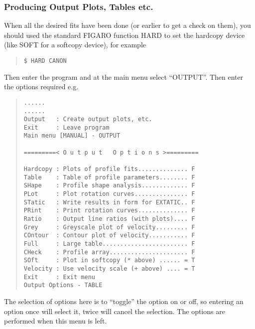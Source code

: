 \subsubsection{Producing Output Plots, Tables etc.}
\label{long.out}

When all the desired fits have been done (or
earlier to get a check on them), you should used the standard FIGARO
function HARD to set the hardcopy device (like SOFT for a softcopy
device), for example
\begin{quote}\begin{verbatim}
$ HARD CANON
\end{verbatim}\end{quote}

Then enter the program and at the main menu select ``OUTPUT''. Then
enter the options required e.g.\
\begin{quote}\begin{verbatim}
......
......
Output   : Create output plots, etc.
Exit     : Leave program
Main menu [MANUAL] - OUTPUT

=========< O u t p u t   O p t i o n s >=========

Hardcopy : Plots of profile fits.............. F
Table    : Table of profile parameters........ F
SHape    : Profile shape analysis............. F
PLot     : Plot rotation curves............... F
STatic   : Write results in form for EXTATIC.. F
PRint    : Print rotation curves.............. F
Ratio    : Output line ratios (with plots).... F
Grey     : Greyscale plot of velocity......... F
COntour  : Contour plot of velocity........... F
Full     : Large table........................ F
CHeck    : Profile array...................... F
SOft     : Plot in softcopy (* above) ...... = T
Velocity : Use velocity scale (+ above) .... = T
Exit     : Exit menu
Output Options - TABLE
\end{verbatim}\end{quote}
The selection of options here is to ``toggle'' the option on or off,
so entering an option once will select it, twice will cancel the
selection. The options are performed when this menu is left.

